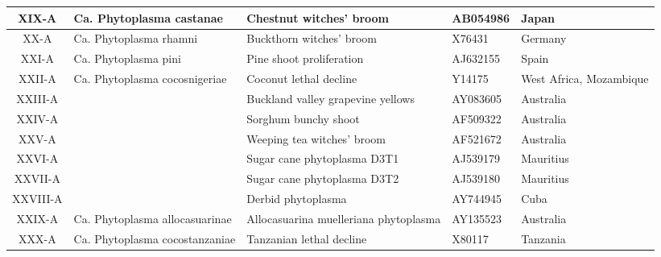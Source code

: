 \begin{longtable}{|c| l| l | >{\centering\arraybackslash}p{3cm} | l| }
XIX-A &Ca. Phytoplasma castanae & Chestnut witches' broom &AB054986& Japan \\ \hline
XX-A &Ca. Phytoplasma rhamni &Buckthorn witches' broom& X76431 &Germany \\ \hline
XXI-A& Ca. Phytoplasma pini &Pine shoot proliferation &AJ632155 &Spain \\ \hline
XXII-A &Ca. Phytoplasma cocosnigeriae & Coconut lethal decline &Y14175& West Africa, Mozambique \\ \hline
XXIII-A & &Buckland valley grapevine yellows& AY083605& Australia \\ \hline
XXIV-A&& Sorghum bunchy shoot& AF509322 &Australia \\ \hline
XXV-A&& Weeping tea witches' broom& AF521672& Australia \\ \hline
XXVI-A &&Sugar cane phytoplasma D3T1& AJ539179& Mauritius \\ \hline
XXVII-A&& Sugar cane phytoplasma D3T2& AJ539180 &Mauritius \\ \hline
XXVIII-A && Derbid phytoplasma&AY744945& Cuba \\ \hline
XXIX-A & Ca. Phytoplasma allocasuarinae&  Allocasuarina muelleriana phytoplasma& AY135523& Australia \\ \hline
XXX-A& Ca. Phytoplasma cocostanzaniae & Tanzanian lethal decline& X80117& Tanzania \\ \hline
\end{longtable} 